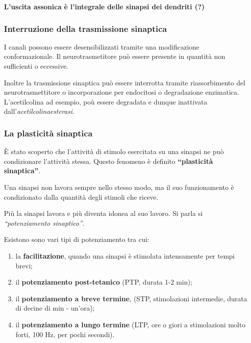\documentclass[]{article}
\begin{document}
\textbf{L'uscita assonica è l'integrale delle sinapsi dei dendriti (?)}

\subsubsection{Interruzione della trasmissione
sinaptica}\label{interruzione-della-trasmissione-sinaptica}

I canali possono essere desensibilizzati tramite una modificazione
conformazionale. Il neurotrasmetitore può essere presente in quantità
non sufficienti o eccessive.

Inoltre la trasmissione sinaptica può essere interrotta tramite
riassorbimento del neurotrasmettitore o incorporazione per endocitosi o
degradazione enzimatica. L'acetilcolina ad esempio, poù essere degradata
e dunque inattivata dall'\emph{acetilcolinaesterasi}.

\subsubsection{La plasticità
sinaptica}\label{la-plasticituxe0-sinaptica}

È stato scoperto che l'attività di stimolo esercitata su una sinapsi ne
può condizionare l'attività stessa. Questo fenomeno è definito
\textbf{``plasticità sinaptica''}.

Una sinapsi non lavora sempre nello stesso modo, ma il suo funzionamento
è condizionato dalla quantità degli stimoli che riceve.

Più la sinapsi lavora e più diventa idonea al suo lavoro. Si parla si
\emph{``potenziamento sinaptico''}.

Esistono sono vari tipi di potenziamento tra cui:

\begin{enumerate}
\def\labelenumi{\arabic{enumi}.}
\itemsep1pt\parskip0pt
\item
  la \textbf{facilitazione}, quando una sinapsi è stimolata intensamente
  per tempi brevi;
\item
  il \textbf{potenziamento post-tetanico} (PTP, durata 1-2 min);
\item
  il \textbf{potenziamento a breve termine}, (STP, stimolazioni
  intermedie, durata di decine di min - un'ora);
\item
  il \textbf{potenziamento a lungo termine} (LTP, ore o giori a
  stimolazioni molto forti, 100 Hz, per pochi secondi).
\end{enumerate}
\end{document}
